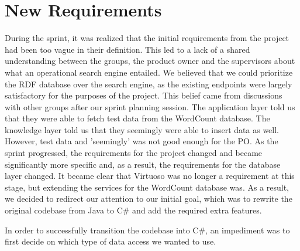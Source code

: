 \section{New Requirements} \label{ssec:newRequirements}
During the sprint, it was realized that the initial requirements from the \knox{} project had been too vague in their definition. 
This led to a lack of a shared understanding between the groups, the product owner and the supervisors about what an operational search engine entailed.  
We believed that we could prioritize the RDF database over the search engine, as the existing endpoints were largely satisfactory for the purposes of the project. This belief came from discussions with other groups after our sprint planning session. The application layer told us that they were able to fetch test data from the WordCount database. The knowledge layer told us that they seemingly were able to insert data as well.
However, test data and 'seemingly' was not good enough for the \knox{} PO.
As the sprint progressed, the requirements for the \knox{} project changed and became significantly more specific and, as a result, the requirements for the database layer changed.
It became clear that Virtuoso was no longer a requirement at this stage, but extending the services for the WordCount database was.
As a result, we decided to redirect our attention to our initial goal, which was to rewrite the original codebase from Java to C\# and add the required extra features.

In order to successfully transition the codebase into C\#, an impediment was to first decide on which type of data access we wanted to use.
